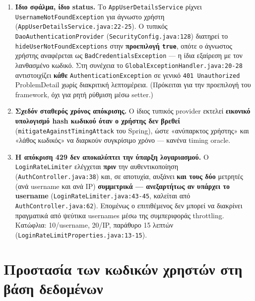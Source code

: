 \documentclass[11pt,a4paper]{article}
\newcommand{\code}[1]{\texttt{#1}}
\begin{document}
\begin{enumerate}[leftmargin=2em]\setlength\itemsep{3pt}
    \item \textbf{Ίδιο σφάλμα, ίδιο status.} Το \code{AppUser\allowbreak{}DetailsService} ρίχνει
          \code{Username\allowbreak{}NotFoundException} για άγνωστο χρήστη (\code{AppUser\allowbreak{}DetailsService.java:22-25}).
          Ο τυπικός \code{Dao\allowbreak{}AuthenticationProvider} (\code{SecurityConfig.java:128}) διατηρεί το
          \code{hide\allowbreak{}UserNotFound\allowbreak{}Exceptions} στην \textbf{προεπιλογή \code{true}}, οπότε ο άγνωστος
          χρήστης αναφέρεται ως \code{Bad\allowbreak{}CredentialsException} --- η ίδια εξαίρεση με τον λανθασμένο
          κωδικό. Στη συνέχεια το \code{Global\allowbreak{}ExceptionHandler.\allowbreak{}java:20-28} αντιστοιχίζει \textbf{κάθε}
          \code{Authentication\allowbreak{}Exception} σε γενικό \code{401 Unauthorized} ProblemDetail χωρίς
          διακριτική λεπτομέρεια. (Πρόκειται για την προεπιλογή του framework, όχι για ρητή ρύθμιση
          μέσω setter.)
    \item \textbf{Σχεδόν σταθερός χρόνος απόκρισης.} Ο ίδιος τυπικός provider εκτελεί \textbf{εικονικό
          υπολογισμό hash κωδικού όταν ο χρήστης δεν βρεθεί} (\code{mitigate\allowbreak{}AgainstTimingAttack} του
          Spring), ώστε «ανύπαρκτος χρήστης» και «λάθος κωδικός» να διαρκούν συγκρίσιμο χρόνο --- κανένα
          timing oracle.
    \item \textbf{Η απόκριση 429 δεν αποκαλύπτει την ύπαρξη λογαριασμού.} Ο \code{LoginRateLimiter} ελέγχεται \textbf{πριν}
          την αυθεντικοποίηση (\code{AuthController.java:38}) και, σε αποτυχία, αυξάνει \textbf{και τους
          δύο} μετρητές (ανά username και ανά IP) \textbf{συμμετρικά --- ανεξαρτήτως αν υπάρχει το
          username} (\code{LoginRateLimiter.java:43-45}, καλείται από \code{AuthController.java:62}).
          Επομένως ο επιτιθέμενος δεν μπορεί να διακρίνει πραγματικά από ψεύτικα usernames μέσω της
          συμπεριφοράς throttling. Κατώφλια: 10/username, 20/IP, παράθυρο 15 λεπτών
          (\code{LoginRateLimit\allowbreak{}Properties.\allowbreak{}java:13-15}).
\end{enumerate}

\section{Προστασία των κωδικών χρηστών στη βάση δεδομένων}
\label{sec:passwords}
\end{document}
